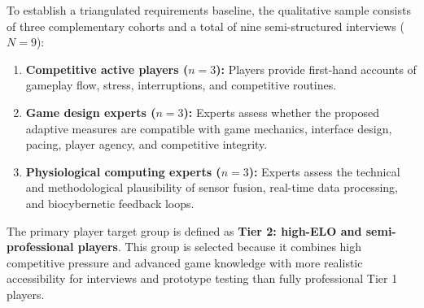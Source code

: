 To establish a triangulated requirements baseline, the qualitative sample consists of three complementary cohorts and a total of nine semi-structured interviews ($N = 9$):
\begin{enumerate}
    \item \textbf{Competitive active players ($n = 3$):} Players provide first-hand accounts of gameplay flow, stress, interruptions, and competitive routines.
    \item \textbf{Game design experts ($n = 3$):} Experts assess whether the proposed adaptive measures are compatible with game mechanics, interface design, pacing, player agency, and competitive integrity.
    \item \textbf{Physiological computing experts ($n = 3$):} Experts assess the technical and methodological plausibility of sensor fusion, real-time data processing, and biocybernetic feedback loops.
\end{enumerate}

The primary player target group is defined as \textbf{Tier 2: high-ELO and semi-professional players}. This group is selected because it combines high competitive pressure and advanced game knowledge with more realistic accessibility for interviews and prototype testing than fully professional Tier 1 players. 

